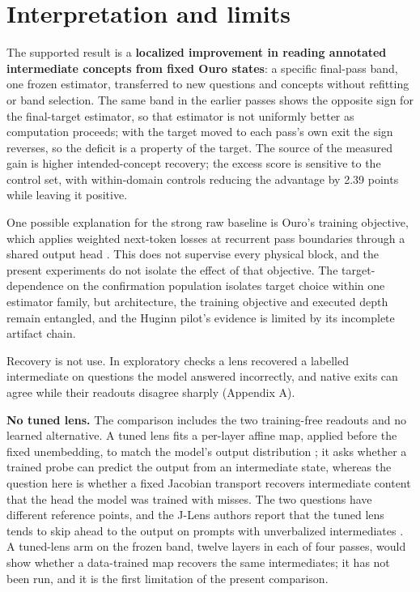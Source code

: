 \section{Interpretation and limits}\label{interpretation-and-limits}

The supported result is a \textbf{localized improvement in reading
annotated intermediate concepts from fixed Ouro states}: a specific
final-pass band, one frozen estimator, transferred to new questions and
concepts without refitting or band selection. The same band in the
earlier passes shows the opposite sign for the final-target estimator,
so that estimator is not uniformly better as computation proceeds; with
the target moved to each pass's own exit the sign reverses, so the
deficit is a property of the target. The source of the measured gain is
higher intended-concept recovery; the excess score is sensitive to the
control set, with within-domain controls reducing the advantage by 2.39
points while leaving it positive.

One possible explanation for the strong raw baseline is Ouro's training
objective, which applies weighted next-token losses at recurrent pass
boundaries through a shared output head \citep{zhu2025ouro}. This does
not supervise every physical block, and the present experiments do not
isolate the effect of that objective. The target-dependence on the
confirmation population isolates target choice within one estimator
family, but architecture, the training objective and executed depth
remain entangled, and the Huginn pilot's evidence is limited by its
incomplete artifact chain.

Recovery is not use. In exploratory checks a lens recovered a labelled
intermediate on questions the model answered incorrectly, and native
exits can agree while their readouts disagree sharply (Appendix A).

\textbf{No tuned lens.} The comparison includes the two training-free
readouts and no learned alternative. A tuned lens fits a per-layer
affine map, applied before the fixed unembedding, to match the model's
output distribution \citep{belrose2023tunedlens}; it asks whether a
trained probe can predict the output from an intermediate state, whereas
the question here is whether a fixed Jacobian transport recovers
intermediate content that the head the model was trained with misses.
The two questions have different reference points, and the J-Lens
authors report that the tuned lens tends to skip ahead to the output on
prompts with unverbalized intermediates \citep{gurnee2026workspace}. A
tuned-lens arm on the frozen band, twelve layers in each of four passes,
would show whether a data-trained map recovers the same intermediates;
it has not been run, and it is the first limitation of the present
comparison.


